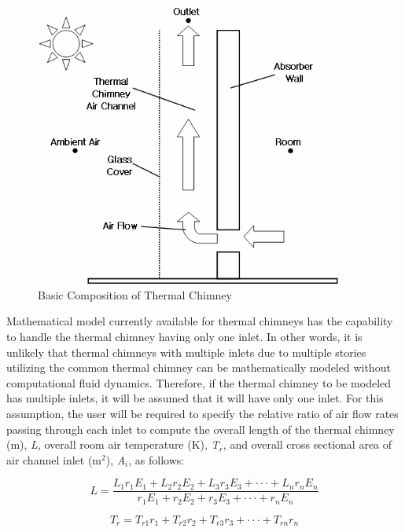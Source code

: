 \begin{figure}[hbtp] %
\centering
\includegraphics[width=0.9\textwidth, height=0.9\textheight, keepaspectratio=true]{media/image7454.png}
\caption{Basic Composition of Thermal Chimney \protect \label{fig:basic-composition-of-thermal-chimney}}
\end{figure}

Mathematical model currently available for thermal chimneys has the capability to handle the thermal chimney having only one inlet. In other words, it is unlikely that thermal chimneys with multiple inlets due to multiple stories utilizing the common thermal chimney can be mathematically modeled without computational fluid dynamics. Therefore, if the thermal chimney to be modeled has multiple inlets, it will be assumed that it will have only one inlet. For this assumption, the user will be required to specify the relative ratio of air flow rates passing through each inlet to compute the overall length of the thermal chimney (m), \emph{L}, overall room air temperature (K), \emph{T\(_{r}\)}, and overall cross sectional area of air channel inlet (m\(^{2}\)), \emph{A\(_{i}\)}, as follows:

\begin{equation}
L = \frac{{{L_1}{r_1}{E_1} + {L_2}{r_2}{E_2} + {L_3}{r_3}{E_3} +  \cdot  \cdot  \cdot  + {L_n}{r_n}{E_n}}}{{{r_1}{E_1} + {r_2}{E_2} + {r_3}{E_3} +  \cdot  \cdot  \cdot  + {r_n}{E_n}}}
\end{equation}

\begin{equation}
{T_r} = {T_{r1}}{r_1} + {T_{r2}}{r_2} + {T_{r3}}{r_3} +  \cdot  \cdot  \cdot  + {T_{rn}}{r_n}
\end{equation}

